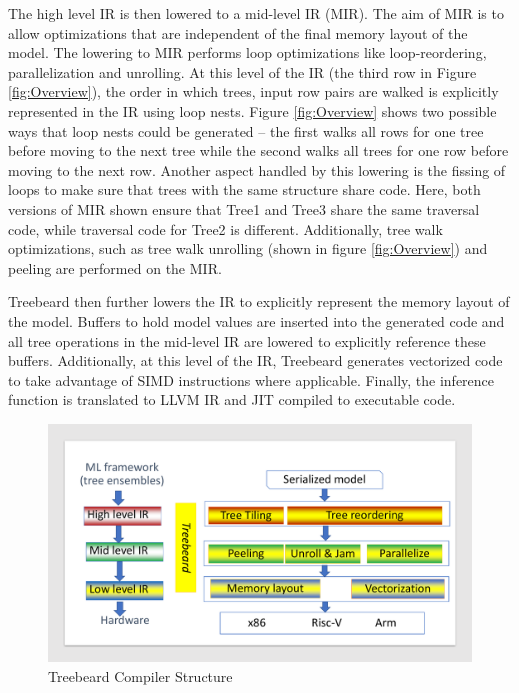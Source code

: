 The high level IR is then lowered to a mid-level IR (MIR). The aim of MIR is 
to allow optimizations that are independent of the final memory layout of the model. 
The lowering to MIR performs loop optimizations like loop-reordering, parallelization and unrolling.
At this level of the IR (the third row in Figure \ref{fig:Overview}),
the order in which trees, input row pairs are walked is explicitly represented in the IR using loop nests.
Figure \ref{fig:Overview} shows two possible ways that loop nests could be generated -- the first
walks all rows for one tree before moving to the next tree while the second walks all trees for 
one row before moving to the next row. Another aspect handled by this lowering is the fissing of 
loops to make sure that trees with the same structure share code. Here, both versions of MIR shown 
ensure that Tree1 and Tree3 share the same traversal code, while traversal code for Tree2 is different.
Additionally, tree walk optimizations, such as tree walk unrolling (shown in figure \ref{fig:Overview}) and 
peeling are performed on the MIR.

Treebeard then further lowers the IR to explicitly represent the memory layout of the model. Buffers to hold model 
values are inserted into the generated code and all tree operations in the mid-level IR are lowered to explicitly 
reference these buffers. Additionally, at this level of the IR, Treebeard generates vectorized code to take 
advantage of SIMD instructions where applicable. Finally, the inference function is translated to LLVM IR and 
JIT compiled to executable code. 


\begin{figure}
  \centering
  \includegraphics[width=\linewidth]{figures/compiler.pdf}
  \caption{Treebeard Compiler Structure}
  \label{Fig:CompilerStructure}
\end{figure}

